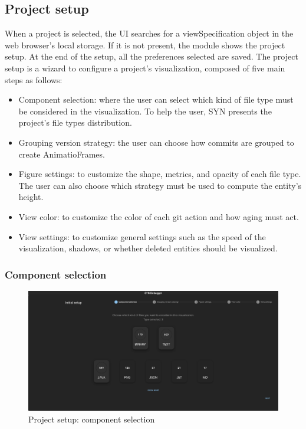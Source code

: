 \subsection{Project setup}
When a project is selected, the UI searches for a viewSpecification object in the web browser's local storage. 
If it is not present, the module shows the project setup. At the end of the setup, all the preferences selected are saved. 
The project setup is a wizard to configure a project's visualization, composed of five main steps as follows:
\begin{itemize}
    \item Component selection: where the user can select which kind of file type must be considered in the visualization. To help the user, SYN presents the project's file types distribution.
    \item Grouping version strategy: the user can choose how commits are grouped to create AnimatioFrames.
    \item Figure settings: to customize the shape, metrics, and opacity of each file type. The user can also choose which strategy must be used to compute the entity's height. 
    \item View color: to customize the color of each git action and how aging must act. 
    \item View settings: to customize general settings such as the speed of the visualization, shadows, or whether deleted entities should be visualized. 
\end{itemize}

\newpage
\subsubsection{Component selection}

\begin{figure}[h]
    \center
    \includegraphics[width=\textwidth]{SYNUI-settings1.png}
    \caption{Project setup: component selection}
    \label{fig:SYNUIsettings1}
\end{figure}


